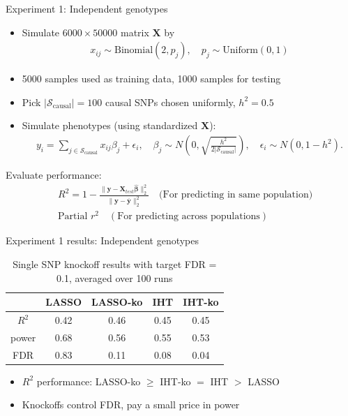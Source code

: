 \documentclass[aspectratio=169, 10pt]{beamer}
\newcommand{\by}{\boldsymbol{y}}
\newcommand{\bX}{\boldsymbol{X}}
\newcommand{\bbeta}{\boldsymbol{\beta}}
\begin{document}
\begin{frame}{Experiment 1: Independent genotypes}
    \begin{itemize}
        \item Simulate $6000 \times 50000$ matrix $\bX$ by
        \begin{align*}
            x_{ij} \sim \text{Binomial}(2, p_j), \quad p_j \sim \text{Uniform}(0, 1)
        \end{align*}
        \item 5000 samples used as training data, 1000 samples for testing
        \item Pick $|\mathcal{S}_{\text{causal}}|=100$ causal SNPs chosen uniformly, $h^2 = 0.5$
        \item Simulate phenotypes (using standardized $\bX$):
        \begin{align*}
            y_i = \sum_{j \in \mathcal{S}_{\text{causal}}} x_{ij}\beta_j + \epsilon_i, \quad \beta_j \sim N\left(0, \sqrt{\frac{h^2}{2|\mathcal{S}_{\text{causal}}|}}\right), \quad \epsilon_i \sim N(0, 1-h^2).
        \end{align*}
    \end{itemize}
    Evaluate performance:
    \begin{align*}
        & R^2 = 1 - \frac{\|\by -\bX_{test}\hat{\bbeta}\|_2^2}{\|\by - \overline{\by}\|_2^2} \quad \text{(For predicting in same population)}\\
        & \text{Partial } r^2 \quad (\text{For predicting across populations})
    \end{align*}
\end{frame}

\begin{frame}{Experiment 1 results: Independent genotypes}
    \begin{table}
        \begin{tabular}{ c|c|c|c|c } 
            \hline
            & LASSO & LASSO-ko & IHT & IHT-ko \\
            \hline
            $R^2$ & 0.42 & 0.46 & 0.45 & 0.45 \\
            power & 0.68 & 0.56 & 0.55 & 0.53\\
            FDR & 0.83 & 0.11 & 0.08 & 0.04 \\
            \hline
        \end{tabular}
        \caption{Single SNP knockoff results with target FDR = 0.1, averaged over 100 runs}
    \end{table}
    \begin{itemize}
        \item $R^2$ performance: LASSO-ko $\ge$ IHT-ko $=$ IHT $>$ LASSO
        \item Knockoffs control FDR, pay a small price in power
    \end{itemize}
\end{frame}
\end{document}
